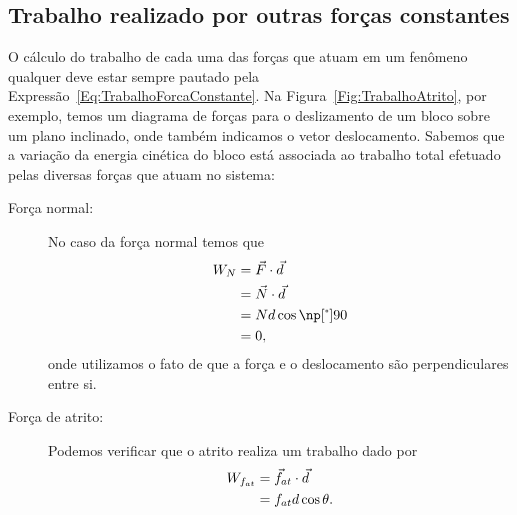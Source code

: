 \subsection{Trabalho realizado por outras forças constantes}

O cálculo do trabalho de cada uma das forças que atuam em um fenômeno qualquer deve estar sempre pautado pela Expressão~\eqref{Eq:TrabalhoForcaConstante}. Na Figura~\ref{Fig:TrabalhoAtrito}, por exemplo, temos um diagrama de forças para o deslizamento de um bloco sobre um plano inclinado, onde também indicamos o vetor deslocamento. Sabemos que a variação da energia cinética do bloco está associada ao trabalho total efetuado pelas diversas forças que atuam no sistema:
\begin{description}
    \item[Força normal:] No caso da força normal temos que
        \begin{align}
            W_N &= \vec{F}\cdot\vec{d} \\
            &= \vec{N}\cdot\vec{d} \\
            &= Nd\cos\degree{90} \\
            &= 0,
        \end{align}
        onde utilizamos o fato de que a força e o deslocamento são perpendiculares entre si.
    
    \item[Força de atrito:] Podemos verificar que o atrito realiza um trabalho dado por
\begin{align}
  W_{f_{at}} &= \vec{f}_{at}\cdot\vec{d} \\
  &= f_{at} d\cos\theta.
\end{align}

\begin{marginfigure}
\centering
{}
\end{marginfigure}
\end{description}
